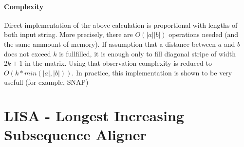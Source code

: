 \documentclass[times, utf8, diplomski]{fer}
\begin{document}
\subsubsection{Complexity}
Direct implementation of the above calculation is proportional with lengths of both input string. More precisely, there are $O(|a||b|)$ operations needed (and the same ammount of memory). If assumption that a distance between $a$ and $b$ does not exceed $k$ is fullfilled, it is enough only to fill diagonal stripe of width $2k+1$ in the matrix. Using that observation complexity is reduced to $O(k*min(|a|,|b|))$. In practice, this implementation is shown to be very usefull (for example, SNAP\cite{SNAP})


\chapter{LISA - Longest Increasing Subsequence Aligner}
\end{document}
